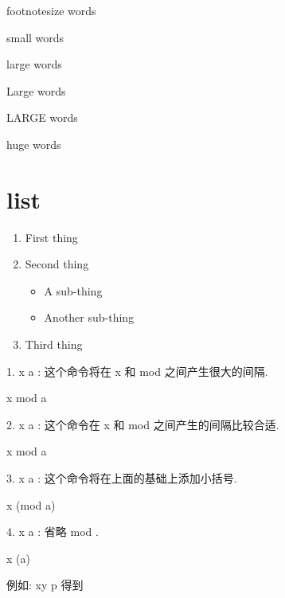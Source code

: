 \documentclass[a4paper,12pt]{article}
\begin{document}
		{\footnotesize footnotesize words}
		
		{\small small words}
		
		{\large large words}
		
		{\Large Large words}
		
		{\LARGE LARGE words}
		
		{\huge huge words}
	\section{list}
			\begin{enumerate}
			\item First thing
			\item Second thing
			\begin{itemize}
			\item A sub-thing
			\item Another sub-thing
			\end{itemize}
			\item Third thing
			\end{enumerate}

1. x \mod a : 这个命令将在 x 和 mod 之间产生很大的间隔.

x   mod a

2. x \bmod a : 这个命令在 x 和 mod 之间产生的间隔比较合适.

x mod a

3. x \pmod a : 这个命令将在上面的基础上添加小括号.

x (mod a)

4. x \pod a : 省略 mod .

x (a)
 

例如: x\equiv y \pmod p 得到
\end{document}
